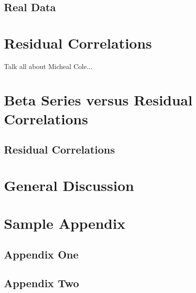 \documentclass[phd,appendix,figures]{uithesis}
\begin{document}
\begin{itemize}
\section{Real Data}

\chapter{Residual Correlations}
Talk all about Micheal Cole...

\chapter{Beta Series versus Residual Correlations}

\section{Residual Correlations}


\chapter{General Discussion}

\appendix

\chapter{Sample Appendix}

\section{Appendix One}
\blindtext

\section{Appendix Two}
\blindtext


\end{itemize}
\end{document}
